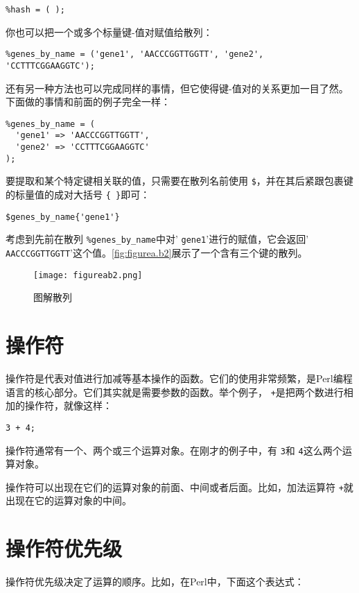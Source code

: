 \begin{lstlisting}
%hash = ( );
\end{lstlisting}

你也可以把一个或多个标量键-值对赋值给散列：

\begin{lstlisting}
%genes_by_name = ('gene1', 'AACCCGGTTGGTT', 'gene2', 'CCTTTCGGAAGGTC');
\end{lstlisting}

还有另一种方法也可以完成同样的事情，但它使得键-值对的关系更加一目了然。下面做的事情和前面的例子完全一样：

\begin{lstlisting}
%genes_by_name = (
  'gene1' => 'AACCCGGTTGGTT',
  'gene2' => 'CCTTTCGGAAGGTC'
);
\end{lstlisting}

要提取和某个特定键相关联的值，只需要在散列名前使用 \verb|$|，并在其后紧跟包裹键的标量值的成对大括号 \verb|{ }|即可：

\begin{lstlisting}
$genes_by_name{'gene1'}
\end{lstlisting}

考虑到先前在散列 \verb|%genes_by_name|中对' \verb|gene1|'进行的赋值，它会返回' \verb|AACCCGGTTGGTT|'这个值。\autoref{fig:figurea.b2}展示了一个含有三个键的散列。

\begin{figure}
  \centering
  \texttt{[image: figureab2.png]}
  \caption{图解散列}
  \label{fig:figurea.b2}
 \end{figure}{}

\section{操作符}
操作符是代表对值进行加减等基本操作的函数。它们的使用非常频繁，是Perl编程语言的核心部分。它们其实就是需要参数的函数。举个例子， \verb|+|是把两个数进行相加的操作符，就像这样：

\begin{lstlisting}
3 + 4;
\end{lstlisting}

操作符通常有一个、两个或三个运算对象。在刚才的例子中，有 \verb|3|和 \verb|4|这么两个运算对象。

操作符可以出现在它们的运算对象的前面、中间或者后面。比如，加法运算符 \verb|+|就出现在它的运算对象的中间。

\section{操作符优先级}
操作符优先级决定了运算的顺序。比如，在Perl中，下面这个表达式：

